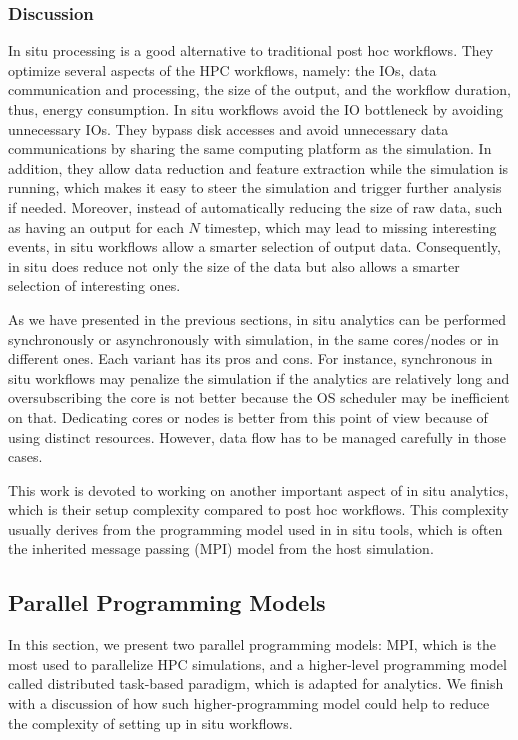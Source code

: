 \subsubsection{Discussion}
In situ processing is a good alternative to traditional post hoc workflows. They optimize several aspects of the HPC workflows, namely: the IOs, data communication and processing, the size of the output, and the workflow duration, thus, energy consumption.
In situ workflows avoid the IO bottleneck by avoiding unnecessary IOs. They bypass disk accesses and avoid unnecessary data communications by sharing the same computing platform as the simulation. 
In addition, they allow data reduction and feature extraction while the simulation is running, which makes it easy to steer the simulation and trigger further analysis if needed. Moreover, instead of automatically reducing the size of raw data, such as having an output for each $N$ timestep, which may lead to missing interesting events, in situ workflows allow a smarter selection of output data. Consequently, in situ does reduce not only the size of the data but also allows a smarter selection of interesting ones.

As we have presented in the previous sections, in situ analytics can be performed synchronously or asynchronously with simulation, in the same cores/nodes or in different ones. Each variant has its pros and cons. For instance, synchronous in situ workflows may penalize the simulation if the analytics are relatively long and oversubscribing the core is not better because the OS scheduler may be inefficient on that. Dedicating cores or nodes is better from this point of view because of using distinct resources. However, data flow has to be managed carefully in those cases. 

This work is devoted to working on another important aspect of in situ analytics, which is their setup complexity compared to post hoc workflows. 
This complexity usually derives from the programming model used in in situ tools, which is often the inherited message passing (MPI) model from the host simulation. 

\subsection{Parallel Programming Models}\label{sec:programmingmodel}

In this section, we present two parallel programming models: MPI, which is the most used to parallelize HPC simulations, and a higher-level programming model called distributed task-based paradigm, which is adapted for analytics. We finish with a discussion of how such  higher-programming model could help to reduce the complexity of setting up in situ workflows.

